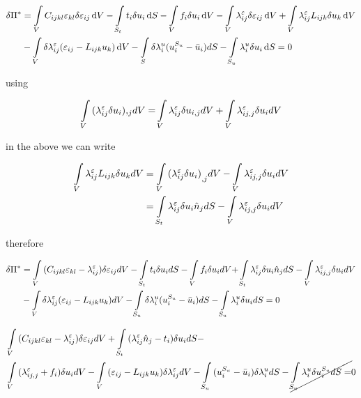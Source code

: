 \begin{equation}
\begin{aligned}
\delta \Pi^* &= \int\limits_V C_{ijkl} \varepsilon_{kl} \delta  \varepsilon_{ij}\dd{V} - \int\limits_{S_t} t_i \delta{u_i} \dd{S}  - \int\limits_V f_i\delta {u_i}\dd{V} - \int\limits_V \lambda_{ij}^{\varepsilon} \delta \varepsilon_{ij}\dd{V}  + \int\limits_V \lambda_{ij}^{\varepsilon} L_{ijk}\delta {u_k}\dd{V}\\
&- \int\limits_V \delta \lambda_{ij}^{\varepsilon} (\varepsilon_{ij} - L_{ijk} u_k)\dd{V} - \int\limits_S \delta \lambda_i^u (u_i^{S_u} - \bar {u}_i)dS - \int\limits_{S_u} \lambda _i^u\delta {u_i}\dd{S} = 0
\end{aligned}
\end{equation}

using

\[\int\limits_V {(\lambda _{ij}^\varepsilon \delta {u_i}){,_j}dV = } \int\limits_V {\lambda _{ij}^\varepsilon \delta {u_{i,j}}dV}  + \int\limits_V {\lambda _{ij,j}^\varepsilon \delta {u_i}dV} \]

in the above we can write

\begin{align*}
\int\limits_V {\lambda _{ij}^\varepsilon {L_{ijk}}\delta {u_k}dV} & = \int\limits_V {{{(\lambda _{ij}^\varepsilon \delta {u_i})}_{,j}}dV}  - \int\limits_V {\lambda _{ij,j}^\varepsilon \delta {u_i}dV}\\
& = \int\limits_{{S_t}} {\lambda _{ij}^\varepsilon \delta {u_i}{{\hat n}_j}dS}  - \int\limits_V {\lambda _{ij,j}^\varepsilon \delta {u_i}dV}
\end{align*}

therefore


\begin{align*}
\delta \Pi^* &= \int\limits_V {({C_{ijkl}}{\varepsilon _{kl}} - \lambda _{ij}^\varepsilon )\delta {\varepsilon _{ij}}dV - \int\limits_{{S_t}} {{t_i}\delta {u_i}dS}  - \int\limits_V {{f_i}\delta {u_i}dV + } } \int\limits_{{S_t}} {\lambda _{ij}^\varepsilon \delta {u_i}{{\hat n}_j}dS}  - \int\limits_V {\lambda _{ij,j}^\varepsilon \delta {u_i}dV}\\
&- \int\limits_V {\delta \lambda _{ij}^\varepsilon ({\varepsilon _{ij}} - {L_{ijk}}{u_k})dV}  - \int\limits_{{S_u}} {\delta \lambda _i^u(u_i^{{S_u}} - {{\bar u}_i})dS}  - \int\limits_{{S_u}} {\lambda _i^u\delta {u_i}dS}  = 0
\end{align*}


\begin{align*}
&\int\limits_V {({C_{ijkl}}{\varepsilon _{kl}} - \lambda _{ij}^\varepsilon )\delta {\varepsilon _{ij}}dV
+ \int\limits_{{S_t}} {(\lambda _{ij}^\varepsilon {{\hat n}_j} - {t_i})\delta {u_i}dS}  - }\\
&\int\limits_V {(\lambda _{ij,j}^\varepsilon  + {f_i})\delta {u_i}dV}
- \int\limits_V {({\varepsilon _{ij}} - {L_{ijk}}{u_k})\delta \lambda _{ij}^\varepsilon dV}
- \int\limits_{{S_u}} {(u_i^{{S_u}} - {{\bar u}_i})\delta \lambda _i^udS}  - \cancel{\int\limits_{{S_u}} {\lambda _i^u\delta u_i^{{S_u}}dS} = } 0
\end{align*}


